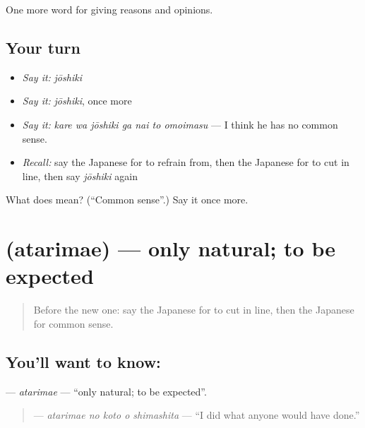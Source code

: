 \begin{grammarlens}[title={What you've built}]
One more word for giving reasons and opinions.
\end{grammarlens}

\subsection*{Your turn}
\begin{itemize}
\raggedright
  \item \emph{Say it:} \emph{jōshiki}
  \item \emph{Say it:} \emph{jōshiki}, once more
  \item \emph{Say it:} \emph{kare wa jōshiki ga nai to omoimasu} — I think he has no common sense.
  \item \emph{Recall:} say the Japanese for to refrain from, then the Japanese for to cut in line, then say \emph{jōshiki} again
\end{itemize}

\begin{tcolorbox}[breakable,colback=teal!4,colframe=teal!35!black,title={Before you move on}]
What does  mean? (\textquotedblleft{}Common sense\textquotedblright{}.) Say it once more.
\end{tcolorbox}
\section[\texorpdfstring{\ja{あたりまえ} (atarimae)}{あたりまえ (atarimae)}]{ (atarimae) — only natural; to be expected}

\label{lesson:JA-C329-atarimae}



\begin{quote}
Before the new one: say the Japanese for to cut in line, then the Japanese for common sense.
\end{quote}

\subsection*{You'll want to know: }
\textbf{} — \emph{atarimae} — \textquotedblleft{}only natural; to be expected\textquotedblright{}.

\begin{quote}
\textbf{  } — \emph{atarimae no koto o shimashita} — \textquotedblleft{}I did what anyone would have done.\textquotedblright{}
\end{quote}

